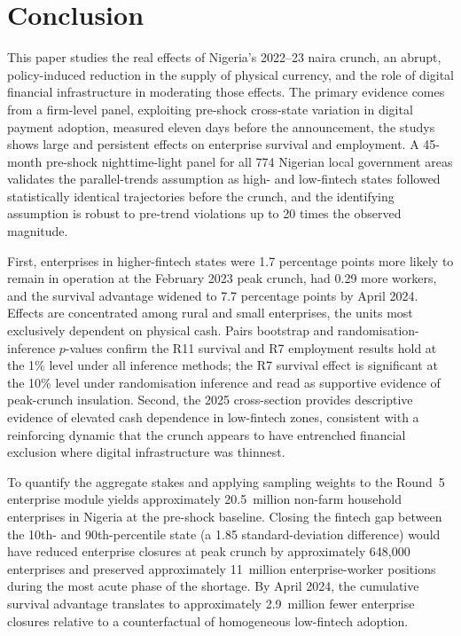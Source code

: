 
\section{Conclusion}
\label{sec:conclusion}

This paper studies the real effects of Nigeria's 2022--23 naira crunch, an
abrupt, policy-induced reduction in the supply of physical currency, and
the role of digital financial infrastructure in moderating those effects.
The primary evidence comes from a firm-level panel, exploiting pre-shock
cross-state variation in digital payment adoption, measured eleven days before
the \CBN{} announcement, the studys shows large and persistent effects
on enterprise survival and employment. A 45-month pre-shock nighttime-light panel for all 774 Nigerian local
government areas validates the parallel-trends assumption as high- and
low-fintech states followed statistically identical \NTL{} trajectories before
the crunch, and the identifying assumption is robust to pre-trend violations
up to 20 times the observed magnitude.

First, enterprises in higher-fintech states were 1.7 percentage points
more likely to remain in operation at the February 2023 peak crunch, had
0.29 more workers, and the survival advantage widened to 7.7 percentage
points by April 2024. Effects are concentrated among rural and small
enterprises, the units most exclusively dependent on physical cash. 
Pairs bootstrap and randomisation-inference $p$-values confirm the R11 survival
and R7 employment results hold at the 1\% level under all inference methods;
the R7 survival effect is significant at the 10\% level under randomisation
inference and read as supportive evidence of peak-crunch insulation. 
Second, the 2025 \WBES{} cross-section
provides descriptive evidence of elevated cash dependence in low-fintech
zones, consistent with a reinforcing dynamic that the crunch appears to have
entrenched financial exclusion where digital infrastructure was thinnest.

To quantify the aggregate stakes and applying sampling weights to the Round~5
enterprise module yields approximately 20.5~million non-farm household
enterprises in Nigeria at the pre-shock baseline. Closing the fintech gap
between the 10th- and 90th-percentile state (a 1.85 standard-deviation
difference) would have reduced enterprise closures at peak crunch by
approximately 648,000 enterprises and preserved approximately 11~million
enterprise-worker positions during the most acute phase of the shortage.
By April 2024, the cumulative survival advantage translates to approximately
2.9~million fewer enterprise closures relative to a counterfactual of
homogeneous low-fintech adoption.

